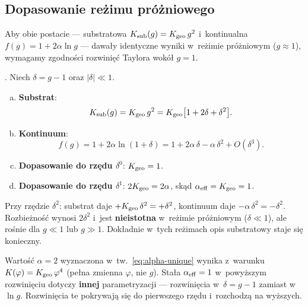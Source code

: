 \subsection{Dopasowanie reżimu próżniowego}\label{ssec:matching}

Aby obie postacie --- substratowa $K_{\rm sub}(g) = K_{\rm geo}\,g^2$
i~kontinualna $f(g) = 1 + 2\alpha\ln g$ --- dawały identyczne
wyniki w~reżimie próżniowym ($g \approx 1$), wymagamy zgodności
rozwinięć Taylora wokół $g = 1$.

\begin{proposition}%
\label{prop:matching}
.
Niech $\delta = g - 1$ oraz $|\delta| \ll 1$.
\begin{enumerate}[(a)]
  \item \textbf{Substrat}:
    \begin{equation}\label{eq:Ksub-taylor}
      K_{\rm sub}(g) = K_{\rm geo}\,g^2
      = K_{\rm geo}\bigl[1 + 2\delta + \delta^2\bigr].
    \end{equation}
  \item \textbf{Kontinuum}:
    \begin{equation}\label{eq:f-taylor}
      f(g) = 1 + 2\alpha\ln(1+\delta)
      = 1 + 2\alpha\,\delta - \alpha\,\delta^2 + O(\delta^3).
    \end{equation}
  \item \textbf{Dopasowanie do rzędu $\delta^0$}: $K_{\rm geo} = 1$.
  \item \textbf{Dopasowanie do rzędu $\delta^1$}:
    $2K_{\rm geo} = 2\alpha$, skąd $\alpha_{\rm eff} = K_{\rm geo} = 1$.
\end{enumerate}
\end{proposition}

\begin{remark}\label{rem:discrepancy}
Przy rzędzie $\delta^2$: substrat daje $+K_{\rm geo}\,\delta^2 = +\delta^2$,
kontinuum daje $-\alpha\,\delta^2 = -\delta^2$.
Rozbieżność wynosi $2\delta^2$ i~jest \textbf{nieistotna}
w~reżimie próżniowym ($\delta \ll 1$), ale rośnie dla $g \ll 1$ lub $g \gg 1$.
Dokładnie w~tych reżimach opis substratowy staje się konieczny.

Wartość $\alpha = 2$ wyznaczona w~tw.~\ref{eq:alpha-unique}
wynika z~warunku $K(\varphi) = K_{\rm geo}\,\varphi^4$
(pełna zmienna $\varphi$, nie $g$).
Stała $\alpha_{\rm eff} = 1$ w~powyższym rozwinięciu
dotyczy \textbf{innej} parametryzacji --- rozwinięcia
w~$\delta = g - 1$ zamiast w~$\ln g$.
Rozwinięcia te pokrywają się do pierwszego rzędu
i~rozchodzą na wyższych.
\end{remark}

